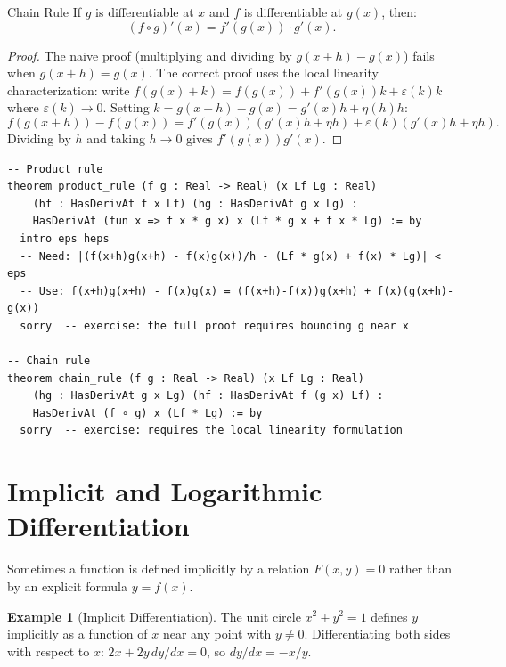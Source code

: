 \documentclass[12pt, openany]{book}
\theoremstyle{plain}
\theoremstyle{definition}
\newtheorem{example}[theorem]{Example}
\theoremstyle{remark}
\newcommand{\eps}{\varepsilon}
\begin{document}
\begin{thmbox}{Chain Rule}
If $g$ is differentiable at $x$ and $f$ is differentiable at $g(x)$, then:
\[ (f \circ g)'(x) = f'(g(x)) \cdot g'(x). \]
\end{thmbox}
\color{black}

\begin{proof}
The naive proof (multiplying and dividing by $g(x+h) - g(x)$) fails when $g(x+h) = g(x)$. The correct proof uses the local linearity characterization: write $f(g(x)+k) = f(g(x)) + f'(g(x))k + \eps(k)k$ where $\eps(k) \to 0$. Setting $k = g(x+h) - g(x) = g'(x)h + \eta(h)h$:
\[ f(g(x+h)) - f(g(x)) = f'(g(x))(g'(x)h + \eta h) + \eps(k)(g'(x)h + \eta h). \]
Dividing by $h$ and taking $h \to 0$ gives $f'(g(x))g'(x)$.
\end{proof}

\begin{leanbox}
\begin{lstlisting}
-- Product rule
theorem product_rule (f g : Real -> Real) (x Lf Lg : Real)
    (hf : HasDerivAt f x Lf) (hg : HasDerivAt g x Lg) :
    HasDerivAt (fun x => f x * g x) x (Lf * g x + f x * Lg) := by
  intro eps heps
  -- Need: |(f(x+h)g(x+h) - f(x)g(x))/h - (Lf * g(x) + f(x) * Lg)| < eps
  -- Use: f(x+h)g(x+h) - f(x)g(x) = (f(x+h)-f(x))g(x+h) + f(x)(g(x+h)-g(x))
  sorry  -- exercise: the full proof requires bounding g near x

-- Chain rule
theorem chain_rule (f g : Real -> Real) (x Lf Lg : Real)
    (hg : HasDerivAt g x Lg) (hf : HasDerivAt f (g x) Lf) :
    HasDerivAt (f ∘ g) x (Lf * Lg) := by
  sorry  -- exercise: requires the local linearity formulation
\end{lstlisting}
\end{leanbox}
\color{black}

\section{Implicit and Logarithmic Differentiation}

Sometimes a function is defined implicitly by a relation $F(x, y) = 0$ rather than by an explicit formula $y = f(x)$.

\begin{example}[Implicit Differentiation]
The unit circle $x^2 + y^2 = 1$ defines $y$ implicitly as a function of $x$ near any point with $y \neq 0$. Differentiating both sides with respect to $x$: $2x + 2y\,dy/dx = 0$, so $dy/dx = -x/y$.
\end{example}
\end{document}
